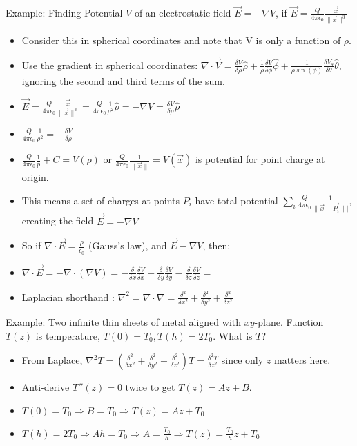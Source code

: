 \documentclass[11pt, oneside]{article}   	%
\begin{document}
 Example: Finding Potential $V$ of an electrostatic field $\vec{E} = -\nabla V$, if $\vec{E} = \frac{Q}{4\pi\epsilon_0}\frac{\vec{x}}{\|\vec{x}\|^3}$
\begin{itemize}
\item Consider this in spherical coordinates and note that V is only a function of $\rho$.
\item Use the gradient in spherical coordinates: $\nabla \cdot \vec{V} = \frac{\delta V}{\delta\rho} \hat{\rho} + \frac{1}{\rho}\frac{\delta V}{\delta \phi} \hat{\phi} + \frac{1}{\rho \sin(\phi)} \frac{\delta V_{\theta}}{\delta \theta}\hat{\theta}$, ignoring the second and third terms of the sum.
\item  $\vec{E} = \frac{Q}{4\pi\epsilon_0}\frac{\vec{x}}{\|\vec{x}\|^3} =  \frac{Q}{4\pi\epsilon_0}\frac{1}{\rho^2}\hat{\rho} = -\nabla V = \frac{\delta V}{\delta\rho} \hat{\rho}$
\item $\frac{Q}{4\pi\epsilon_0}\frac{1}{\rho^2} = -\frac{\delta V}{\delta \rho}$
\item $\frac{Q}{4\pi\epsilon_0}\frac{1}{p} + C = V(\rho)$ or $\frac{Q}{4\pi\epsilon_0}\frac{1}{\|\vec{x}\|} = V(\vec{x})$ is potential for point charge at origin.
\item This means a set of charges at points $P_i$ have total potential $\sum_i \frac{Q}{4\pi\epsilon_0}\frac{1}{\|\vec{x} - \vec{P_i}\||}$, creating the field $\vec{E} = -\nabla V$
\item So if $\nabla \cdot \vec{E} = \frac{\rho}{\epsilon_0}$ (Gauss's law), and $\vec{E} -\nabla V$, then:
\item $\nabla \cdot \vec{E} = -\nabla \cdot (\nabla V) = -\frac{\delta}{\delta x}\frac{\delta V}{\delta x} - \frac{\delta}{\delta y}\frac{\delta V}{\delta y} -\frac{\delta}{\delta z}\frac{\delta V}{\delta z} =$ 
\item   Laplacian shorthand : $\nabla^2 = \nabla \cdot \nabla = \frac{\delta^2}{\delta x^2} +  \frac{\delta^2}{\delta y^2} +  \frac{\delta^2}{\delta z^2}$
\end{itemize}

Example: Two infinite thin sheets of metal aligned with $xy$-plane.  Function $T(z)$ is temperature, $T(0) = T_0, T(h)= 2T_0$.  What is $T$?

\begin{itemize}
\item From Laplace, $\nabla^2 T = (\frac{\delta^2}{\delta x^2} +  \frac{\delta^2}{\delta y^2} +  \frac{\delta^2}{\delta z^2})T = \frac{\delta^2T}{\delta z^2}$ since only $z$ matters here.
\item Anti-derive $T''(z) = 0$ twice to get $T(z) = Az+B$.  
\item $T(0) = T_0 \Rightarrow B = T_0 \Rightarrow T(z) = Az+T_0$
\item $T(h) = 2T_0 \Rightarrow Ah = T_0 \Rightarrow A = \frac{T_0}{h} \Rightarrow T(z) = \frac{T_0}{h}z+ T_0$
\end{itemize}
\end{document}
